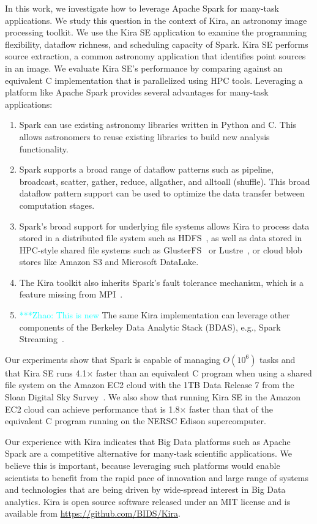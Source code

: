 \documentclass[10pt,journal,compsoc]{IEEEtran}
\newcommand{\zhaonote}[1]{{\textcolor{cyan}    { ***Zhao:      #1 }}}
\newcommand{\zhaonote}[1]{}
\begin{document}
In this work, we investigate how to leverage Apache Spark for many-task applications.
We study this question in the context of Kira, an astronomy image processing toolkit.
We use the Kira SE application to examine the programming flexibility, dataflow richness,
and scheduling capacity of Spark. Kira SE performs source extraction, a common astronomy application that identifies point sources in an image. We evaluate Kira SE's performance by comparing against
an equivalent C implementation that is parallelized using HPC tools. Leveraging a platform like Apache Spark provides several advantages for many-task applications:
\begin{enumerate}
\item Spark can use existing astronomy libraries written in Python and C.
This allows astronomers to reuse existing libraries to build new analysis functionality.
\item Spark supports a broad range of dataflow patterns such as pipeline, broadcast, scatter, gather, reduce, allgather,
and alltoall (shuffle). This broad dataflow pattern support can be used to optimize the data transfer between computation stages.
\item Spark's broad support for underlying file systems allows Kira to process data stored in a distributed file system such as HDFS~\cite{shvachko10}, 
as well as data stored in HPC-style shared file systems such as GlusterFS~\cite{davies13} or Lustre~\cite{donovan03}, or cloud blob stores like Amazon S3 and Microsoft DataLake.
\item The Kira toolkit also inherits Spark's fault tolerance mechanism, which is a feature missing from MPI~\cite{gropp96}.
\item \zhaonote{This is new} The same Kira implementation can leverage other components of the Berkeley Data Analytic Stack (BDAS), e.g., Spark Streaming~\cite{zaharia13}.
\end{enumerate}

Our experiments show that Spark is capable of managing $O(10^6)$ tasks and that Kira SE runs 4.1$\times$ faster than an equivalent C program when using a shared file system on the Amazon EC2 cloud with the 1TB Data Release 7 from the Sloan Digital Sky Survey~\cite{york00}. We also show that running Kira SE in the Amazon EC2 cloud can achieve performance that is 1.8$\times$ faster than that of the equivalent C program running on the NERSC Edison supercomputer.

Our experience with Kira indicates that Big Data platforms such as Apache Spark are a competitive alternative for many-task scientific applications.   
We believe this is important, because leveraging such platforms would enable scientists to benefit from the rapid pace of innovation and large range of systems and technologies that are being driven by wide-spread interest in Big Data analytics.
Kira is open source software released under an MIT license and is available from \linebreak \url{https://github.com/BIDS/Kira}.
\end{document}

